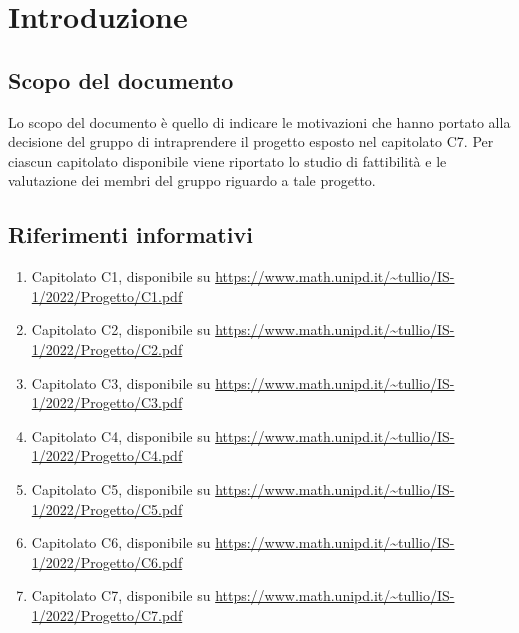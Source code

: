 \section{Introduzione}\label{section:introduzione}

\subsection{Scopo del documento}
Lo scopo del documento è quello di indicare le motivazioni che hanno portato alla decisione del gruppo di intraprendere il progetto esposto nel capitolato C7.\newline
Per ciascun capitolato disponibile viene riportato lo studio di fattibilità e le valutazione dei membri del gruppo riguardo a tale progetto.

\subsection{Riferimenti informativi}
    \begin{small}
        \begin{enumerate}
            \item Capitolato C1, disponibile su \url{https://www.math.unipd.it/~tullio/IS-1/2022/Progetto/C1.pdf} 
            \item Capitolato C2, disponibile su \url{https://www.math.unipd.it/~tullio/IS-1/2022/Progetto/C2.pdf} 
            \item Capitolato C3, disponibile su \url{https://www.math.unipd.it/~tullio/IS-1/2022/Progetto/C3.pdf} 
            \item Capitolato C4, disponibile su \url{https://www.math.unipd.it/~tullio/IS-1/2022/Progetto/C4.pdf} 
            \item Capitolato C5, disponibile su \url{https://www.math.unipd.it/~tullio/IS-1/2022/Progetto/C5.pdf}
            \item Capitolato C6, disponibile su \url{https://www.math.unipd.it/~tullio/IS-1/2022/Progetto/C6.pdf}
            \item Capitolato C7, disponibile su \url{https://www.math.unipd.it/~tullio/IS-1/2022/Progetto/C7.pdf}
        \end{enumerate}
    \end{small}